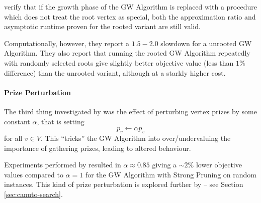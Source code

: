 \citet{Johnson:2000:PCS:338219.338637} verify that if the growth phase of the GW Algorithm
is replaced with a procedure which does not treat the root vertex as special, both the
approximation ratio and asymptotic runtime proven for the rooted variant are still valid.

Computationally, however, they report a $1.5-2.0$ slowdown for a unrooted GW Algorithm. They also
report that running the rooted GW Algorithm repeatedly with randomly selected roots give slightly
better objective value (less than $1\%$ difference) than the unrooted variant, although at a starkly
higher cost.
\paragraph{Prize Perturbation} The third thing investigated by \citet{Johnson:2000:PCS:338219.338637} was
the effect of perturbing vertex prizes by some constant $\alpha$, that is setting
\[p_v \gets \alpha p_v\]
for all $v \in V$. This ``tricks'' the GW Algorithm into over/undervaluing the importance of gathering prizes,
 leading to altered behaviour.

 Experiments performed by \citeauthor{Johnson:2000:PCS:338219.338637} resulted in $\alpha \approx 0.85$ giving a $\sim2\%$
 lower objective values compared to $\alpha = 1$ for the GW Algorithm with Strong Pruning on random instances.
  This kind of prize perturbation is explored further by \citet{canuto2001local} -- see Section \ref{sec:canuto-search}.


